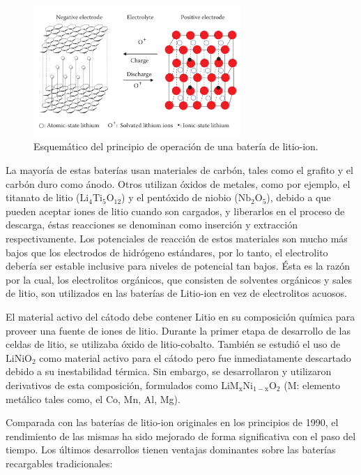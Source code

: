 \documentclass[10pt,a4paper]{article}
\begin{document}
\begin{figure}[h!]
    \begin{center}
	\includegraphics[width=0.7\textwidth]{prin_litio}
	\caption{Esquem\'atico del principio de operaci\'on de una bater\'ia de
	litio-ion.}
	\label{op_lithium-ion}
    \end{center}
\end{figure}

\noindent La mayoría de estas baterías usan materiales de carbón, tales como el
grafito y el carbón duro como ánodo. Otros utilizan óxidos de metales, como por
ejemplo, el titanato de litio ($\mathrm{Li_4Ti_5O_{12}}$) y el pentóxido de
niobio ($\mathrm{Nb_2O_5}$), debido a que pueden aceptar iones de litio cuando
son cargados, y liberarlos en el proceso de descarga, \'estas reacciones se
denominan como inserción y extracción respectivamente. Los potenciales de
reacción de estos materiales son mucho más bajos que los electrodos de hidrógeno
estándares, por lo tanto, el electrolito debería ser estable inclusive para
niveles de potencial tan bajos. Ésta es la razón por la cual, los electrolitos
orgánicos, que consisten de solventes orgánicos y sales de litio, son utilizados
en las baterías de Litio-ion en vez de electrolitos acuosos.

\noindent El material activo del cátodo debe contener Litio en su composición
química para proveer una fuente de iones de litio. Durante la primer etapa de
desarrollo de las celdas de litio, se utilizaba \'oxido de litio-cobalto.
También se estudió el uso de $\mathrm{LiNiO_2}$ como material activo para el 
cátodo pero fue inmediatamente descartado debido a su inestabilidad térmica. 
Sin embargo, se desarrollaron y utilizaron derivativos de esta composición, 
formulados como $\mathrm{LiM_xNi_{1-x}O_2}$  (M: elemento metálico tales como, 
el Co, Mn, Al, Mg).

\noindent Comparada con las baterías de litio-ion originales en los principios 
de 1990, el rendimiento de las mismas ha sido mejorado de forma significativa 
con el paso del tiempo. Los últimos desarrollos tienen ventajas dominantes sobre 
las baterías recargables tradicionales:
\end{document}
